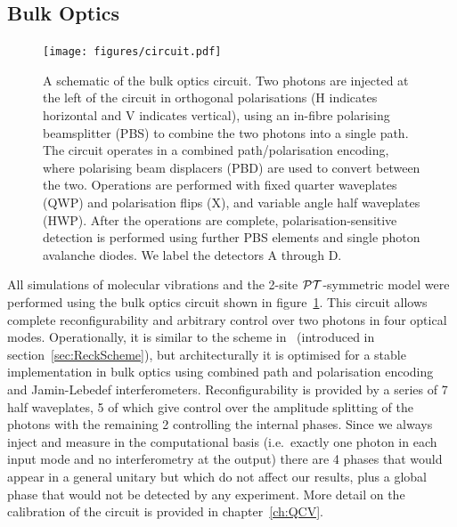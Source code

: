 \subsection{Bulk Optics}
\label{sec:BulkReck}
\begin{figure}[t]
  \centering
  \texttt{[image: figures/circuit.pdf]}
  \caption[A schematic of the bulk optics circuit used for simulations]
  {A schematic of the bulk optics circuit. Two photons are injected at
  the left of the circuit in orthogonal polarisations (H indicates
  horizontal and V indicates vertical), using an in-fibre polarising
  beamsplitter (PBS) to combine the two photons into a single path. The circuit
  operates in a combined path/polarisation encoding, where polarising beam
  displacers (PBD) are used to convert between the two. Operations are performed
  with fixed quarter waveplates (QWP) and polarisation flips (X), and variable
  angle half waveplates (HWP). After the operations are complete,
  polarisation-sensitive detection is performed using further PBS elements and
  single photon avalanche diodes. We label the detectors A through D.}
  \label{fig:circuit}
\end{figure}
All simulations of molecular vibrations and the 2-site \(\mathcal{PT}\)-symmetric model
were performed using the bulk optics circuit shown in
figure~\ref{fig:circuit}. This circuit allows complete reconfigurability and
arbitrary control over two photons in four optical modes. Operationally, it is
similar to the scheme in~\cite{reck} (introduced in
section~\ref{sec:ReckScheme}), but architecturally it is optimised for a stable
implementation in bulk optics using combined path and polarisation encoding and 
Jamin-Lebedef interferometers. Reconfigurability is provided by a series of 7
half waveplates, 5 of which give control over the amplitude splitting of the
photons with the remaining 2 controlling the internal phases. Since we always
inject and measure in the computational basis (i.e.\ exactly one photon in each
input mode and no interferometry at the output) there are 4 phases that would
appear in a general unitary but which do not affect our results, plus a global
phase that would not be detected by any experiment. More detail on the
calibration of the circuit is provided in chapter~\ref{ch:QCV}.


